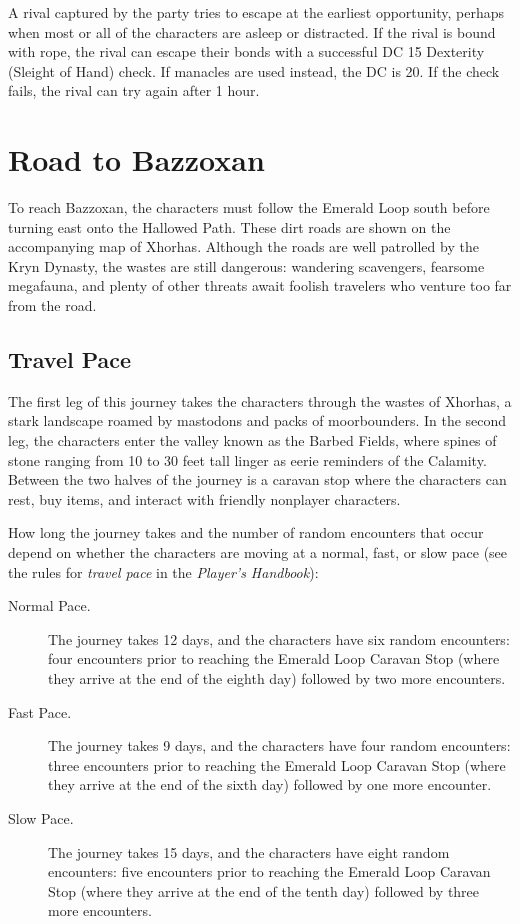 \documentclass[10pt,a4paper,twoside,bg=print,twocolumn,openany,nodeprecatedcode]{dndbook}
\begin{document}
A rival captured by the party tries to escape at the earliest opportunity, perhaps when most or all of the characters are asleep or distracted. If the rival is bound with rope, the rival can escape their bonds with a successful DC 15 Dexterity (Sleight of Hand) check. If manacles are used instead, the DC is 20. If the check fails, the rival can try again after 1 hour.

\section{Road to Bazzoxan}
To reach Bazzoxan, the characters must follow the Emerald Loop south before turning east onto the Hallowed Path. These dirt roads are shown on the accompanying map of Xhorhas. Although the roads are well patrolled by the Kryn Dynasty, the wastes are still dangerous: wandering scavengers, fearsome megafauna, and plenty of other threats await foolish travelers who venture too far from the road.

\subsection{Travel Pace}
The first leg of this journey takes the characters through the wastes of Xhorhas, a stark landscape roamed by mastodons and packs of moorbounders. In the second leg, the characters enter the valley known as the Barbed Fields, where spines of stone ranging from 10 to 30 feet tall linger as eerie reminders of the Calamity. Between the two halves of the journey is a caravan stop where the characters can rest, buy items, and interact with friendly nonplayer characters.

How long the journey takes and the number of random encounters that occur depend on whether the characters are moving at a normal, fast, or slow pace (see the rules for \textit{travel pace} in the \textit{Player's Handbook}):


\begin{description}
\item[Normal Pace.]
The journey takes 12 days, and the characters have six random encounters: four encounters prior to reaching the Emerald Loop Caravan Stop (where they arrive at the end of the eighth day) followed by two more encounters.
\item[Fast Pace.]
The journey takes 9 days, and the characters have four random encounters: three encounters prior to reaching the Emerald Loop Caravan Stop (where they arrive at the end of the sixth day) followed by one more encounter.
\item[Slow Pace.]
The journey takes 15 days, and the characters have eight random encounters: five encounters prior to reaching the Emerald Loop Caravan Stop (where they arrive at the end of the tenth day) followed by three more encounters.
\end{description}
\end{document}
